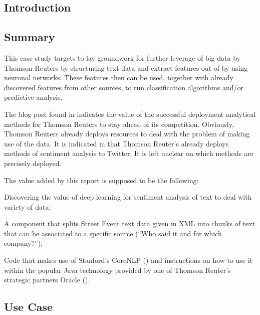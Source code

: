 \documentclass[twoside]{article}
\begin{document}
\begin{multicols}{2} %

\section{Introduction}

\subsection{Summary}
\par This case study targets to lay groundwork for further leverage of big data by Thomson Reuters by structuring text data and extract features out of by using neuronal networks. These features then can be used, together with already discovered features from other sources, to run classification algorithms and/or predictive analysis. 

\par The blog post found in \cite{blog:2014} indicates the value of the successful deployment analytical methods for Thomson Reuters to stay ahead of its competition. Obviously, Thomson Reuters already deploys resources to deal with the problem of making use of the data. It is indicated in \cite{techcrunch:2014} that Thomson Reuter's already deploys methods of sentiment analysis to Twitter. It is left unclear on which methods are precisely deployed.

The value added by this report is supposed to be the following:
\begin{compactitem}

\item Discovering the value of deep learning for sentiment analysis of text to deal with variety of data;
\item A component that splits Street Event text data given in XML into chunks of text that can be associated to a specific source (``Who said it and for which company?'');
\item Code that makes use of Stanford's CoreNLP (\cite{manning-EtAl:2014:P14-5}) and instructions on how to use it within the popular Java technology provided by one of Thomson Reuter's strategic partners Oracle (\cite{forbes:2013}).
\end{compactitem}

\subsection{Use Case}


\end{multicols}
\end{document}

